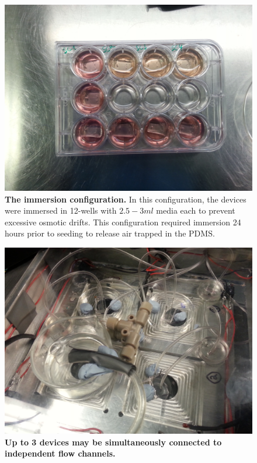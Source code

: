         \begin{figure}[h]
           \centering
            \includegraphics[width=12cm]{chapter4/figures/immersionMethod/12WellImmersion.jpg}
            \caption[The immersion maintenance configuration]{\textbf{The immersion configuration.} In this configuration, the devices were immersed in 12-wells with \(2.5-3 ml\) media each to prevent excessive osmotic drifts. This configuration required immersion 24 hours prior to seeding to release air trapped in the PDMS.}
            \label{fig:devices:immersion}
        \end{figure}

        \begin{figure}[!h]
            \centering
            \includegraphics[width=15cm]{chapter2/figures/flow/3Devices.jpg}
            \caption[Image of 3 coverslip devices under flow simultaneously]{\textbf{Up to 3 devices may be simultaneously connected to independent flow channels.}}
            \label{fig:app:3Devices}

        \end{figure}


